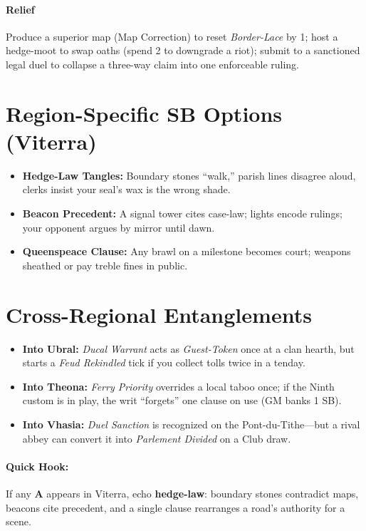 \paragraph{Relief} Produce a superior map (Map Correction) to reset \emph{Border-Lace} by 1; host a hedge-moot to swap oaths (spend 2 \Boons{} to downgrade a riot); submit to a sanctioned legal duel to collapse a three-way claim into one enforceable ruling.

\medskip

\section*{Region-Specific SB Options (Viterra)}
\begin{itemize}
\item \textbf{Hedge-Law Tangles:} Boundary stones “walk,” parish lines disagree aloud, clerks insist your seal’s wax is the wrong shade.
\item \textbf{Beacon Precedent:} A signal tower cites case-law; lights encode rulings; your opponent argues by mirror until dawn.
\item \textbf{Queenspeace Clause:} Any brawl on a milestone becomes court; weapons sheathed or pay treble fines in public.
\end{itemize}

\section*{Cross-Regional Entanglements}
\begin{itemize}
\item \textbf{Into Ubral:} \emph{Ducal Warrant} acts as \emph{Guest-Token} once at a clan hearth, but starts a \emph{Feud Rekindled} tick if you collect tolls twice in a tenday.
\item \textbf{Into Theona:} \emph{Ferry Priority} overrides a local taboo once; if the Ninth custom is in play, the writ “forgets” one clause on use (GM banks 1 SB).
\item \textbf{Into Vhasia:} \emph{Duel Sanction} is recognized on the Pont-du-Tithe—but a rival abbey can convert it into \emph{Parlement Divided} on a Club draw.
\end{itemize}

\paragraph*{Quick Hook:} If any \textbf{A} appears in Viterra, echo \textbf{hedge-law}: boundary stones contradict maps, beacons cite precedent, and a single clause rearranges a road’s authority for a scene.

